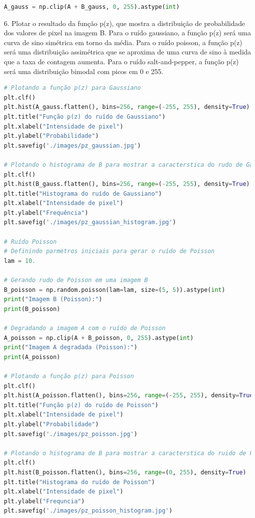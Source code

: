\documentclass[10pt,a4paper]{article}
\begin{document}
\begin{lstlisting}[language=Python]
A_gauss = np.clip(A + B_gauss, 0, 255).astype(int)
\end{lstlisting}

\begin{flushleft}
6. Plotar o resultado da função p(z), que mostra a distribuição de probabilidade dos valores de pixel na imagem B. Para o ruído gaussiano, a função p(z) será uma curva de sino simétrica em torno da média. Para o ruído poisson, a função p(z) será uma distribuição assimétrica que se aproxima de uma curva de sino à medida que a taxa de contagem aumenta. Para o ruído salt-and-pepper, a função p(z) será uma distribuição bimodal com picos em 0 e 255.
\end{flushleft}

\begin{lstlisting}[language=Python]
# Plotando a função p(z) para Gaussiano
plt.clf()
plt.hist(A_gauss.flatten(), bins=256, range=(-255, 255), density=True)
plt.title("Função p(z) do ruído de Gaussiano")
plt.xlabel("Intensidade de pixel")
plt.ylabel("Probabilidade")
plt.savefig('./images/pz_gaussian.jpg')

# Plotando o histograma de B para mostrar a caracterstica do rudo de Gaussiano
plt.clf()
plt.hist(B_gauss.flatten(), bins=256, range=(-255, 255), density=True)
plt.title("Histograma do ruído de Gaussiano")
plt.xlabel("Intensidade de pixel")
plt.ylabel("Frequência")
plt.savefig('./images/pz_gaussian_histogram.jpg')

# Ruído Poisson
# Definindo parmetros iniciais para gerar o ruído de Poisson
lam = 10.

# Gerando rudo de Poisson em uma imagem B
B_poisson = np.random.poisson(lam=lam, size=(5, 5)).astype(int)
print("Imagem B (Poisson):")
print(B_poisson)

# Degradando a imagem A com o ruído de Poisson
A_poisson = np.clip(A + B_poisson, 0, 255).astype(int)
print("Imagem A degradada (Poisson):")
print(A_poisson)

# Plotando a função p(z) para Poisson
plt.clf()
plt.hist(A_poisson.flatten(), bins=256, range=(-255, 255), density=True)
plt.title("Função p(z) do ruído de Poisson")
plt.xlabel("Intensidade de pixel")
plt.ylabel("Probabilidade")
plt.savefig('./images/pz_poisson.jpg')

# Plotando o histograma de B para mostrar a caracterstica do ruido de Poisson
plt.clf()
plt.hist(B_poisson.flatten(), bins=256, range=(0, 255), density=True)
plt.title("Histograma do ruído de Poisson")
plt.xlabel("Intensidade de pixel")
plt.ylabel("Frequncia")
plt.savefig('./images/pz_poisson_histogram.jpg')
\end{lstlisting}
\end{document}
